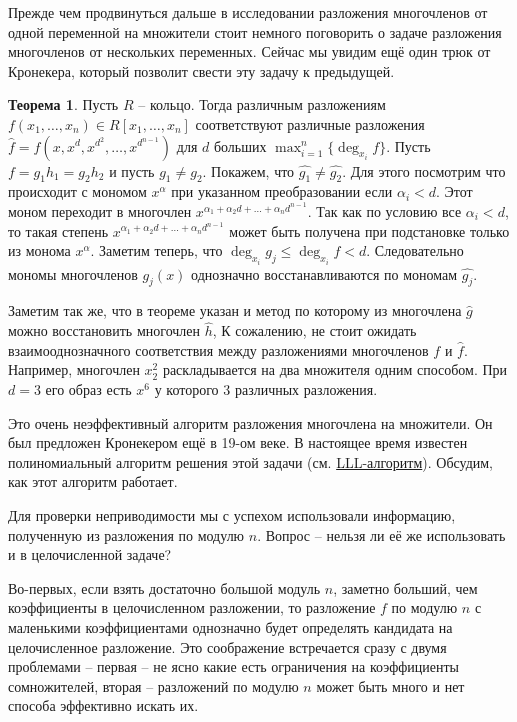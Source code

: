 \documentclass[10pt,a4paper,oneside]{book}
\theoremstyle{definition}
\newtheorem{thm}{\color{red!40!black}Теорема}
\renewcommand{\leq}{\leqslant}
\def\thrm{\begin{thm}}
\def\ethrm{\end{thm}}
\begin{document}
Прежде чем продвинуться дальше в исследовании разложения многочленов от одной переменной на множители стоит немного поговорить о задаче разложения многочленов от нескольких переменных. Сейчас мы увидим ещё один трюк от Кронекера, который позволит свести эту задачу к предыдущей.

\thrm Пусть $R$ -- кольцо. Тогда различным разложениям $f(x_1,\dots,x_n)\in R[x_1,\dots,x_n]$   соответствуют различные разложения $\hat{f}=f(x, x^d, x^{d^2}, \dots, x^{d^{n-1}})$ для $d$ больших $\max_{i=1}^n \{\deg_{x_i} f\}$.
\proof Пусть $f=g_1h_1=g_2h_2$ и пусть $g_1\neq g_2$. Покажем, что $\hat{g_1}\neq \hat{g_2}$. Для этого посмотрим что происходит с мономом $x^{\alpha}$ при указанном преобразовании если $\alpha_i < d$. Этот моном переходит в многочлен $x^{\alpha_1+\alpha_2d+\dots+\alpha_n d^{n-1}}$. Так как по условию все $\alpha_i<d$, то такая степень  $x^{\alpha_1+\alpha_2d+\dots+\alpha_n d^{n-1}}$ может быть получена при подстановке только из монома $x^{\alpha}$. Заметим теперь, что $\deg_{x_i} g_j \leq \deg_{x_i} f <d$. Следовательно мономы многочленов $g_j(x)$ однозначно восстанавливаются по мономам $\hat{g_j}$.
\endproof
\ethrm

Заметим так же, что в теореме указан и метод по которому из многочлена $\hat{g}$ можно восстановить многочлен $\hat h$,
К сожалению, не стоит ожидать взаимооднозначного соответствия между разложениями многочленов $f$ и $\hat{f}$. Например, многочлен $x_2^2$ раскладывается на два множителя одним способом. При $d=3$ его образ есть $x^6$ у которого 3 различных разложения.

Это очень неэффективный алгоритм разложения многочлена на множители. Он был предложен Кронекером ещё в 19-ом веке. В настоящее время известен полиномиальный алгоритм решения этой задачи (см. \href{http://www.math.leidenuniv.nl/%7Ehwl/PUBLICATIONS/1982f/art.pdf}{LLL-алгоритм}). Обсудим, как этот алгоритм работает.

Для проверки неприводимости мы с успехом использовали информацию, полученную из разложения по модулю $n$. Вопрос -- нельзя ли её же использовать и в целочисленной задаче? 

Во-первых, если взять достаточно большой модуль $n$, заметно больший, чем коэффициенты в целочисленном разложении, то разложение $f$ по модулю $n$ с маленькими коэффициентами однозначно будет определять кандидата на целочисленное разложение. Это соображение встречается сразу с двумя проблемами -- первая -- не ясно какие есть ограничения на коэффициенты сомножителей, вторая -- разложений по модулю $n$ может быть много и нет способа эффективно искать их.
\end{document}
